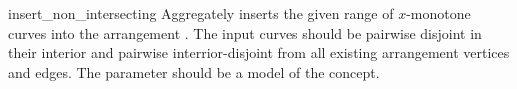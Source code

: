 \begin{ccRefFunction}{insert_non_intersecting}
   {Aggregately inserts the given range of $x$-monotone curves
    \ccc{[first,last)} into the arrangement . The input curves should
    be pairwise disjoint in their interior and pairwise interrior-disjoint
    from all existing arrangement vertices and edges. 
    The  parameter should be a model of the
     concept.
    }

\end{ccRefFunction}

\ccRefPageEnd
